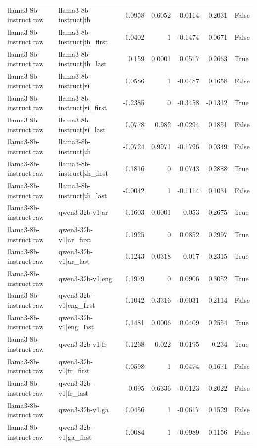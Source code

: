 \begin{table}
\begin{tabular}{l l r r r r l}
llama3-8b-instruct|raw & llama3-8b-instruct|th & 0.0958 & 0.6052 & -0.0114 & 0.2031 & False \\
llama3-8b-instruct|raw & llama3-8b-instruct|th_first & -0.0402 & 1 & -0.1474 & 0.0671 & False \\
llama3-8b-instruct|raw & llama3-8b-instruct|th_last & 0.159 & 0.0001 & 0.0517 & 0.2663 & True \\
llama3-8b-instruct|raw & llama3-8b-instruct|vi & 0.0586 & 1 & -0.0487 & 0.1658 & False \\
llama3-8b-instruct|raw & llama3-8b-instruct|vi_first & -0.2385 & 0 & -0.3458 & -0.1312 & True \\
llama3-8b-instruct|raw & llama3-8b-instruct|vi_last & 0.0778 & 0.982 & -0.0294 & 0.1851 & False \\
llama3-8b-instruct|raw & llama3-8b-instruct|zh & -0.0724 & 0.9971 & -0.1796 & 0.0349 & False \\
llama3-8b-instruct|raw & llama3-8b-instruct|zh_first & 0.1816 & 0 & 0.0743 & 0.2888 & True \\
llama3-8b-instruct|raw & llama3-8b-instruct|zh_last & -0.0042 & 1 & -0.1114 & 0.1031 & False \\
llama3-8b-instruct|raw & qwen3-32b-v1|ar & 0.1603 & 0.0001 & 0.053 & 0.2675 & True \\
llama3-8b-instruct|raw & qwen3-32b-v1|ar_first & 0.1925 & 0 & 0.0852 & 0.2997 & True \\
llama3-8b-instruct|raw & qwen3-32b-v1|ar_last & 0.1243 & 0.0318 & 0.017 & 0.2315 & True \\
llama3-8b-instruct|raw & qwen3-32b-v1|eng & 0.1979 & 0 & 0.0906 & 0.3052 & True \\
llama3-8b-instruct|raw & qwen3-32b-v1|eng_first & 0.1042 & 0.3316 & -0.0031 & 0.2114 & False \\
llama3-8b-instruct|raw & qwen3-32b-v1|eng_last & 0.1481 & 0.0006 & 0.0409 & 0.2554 & True \\
llama3-8b-instruct|raw & qwen3-32b-v1|fr & 0.1268 & 0.022 & 0.0195 & 0.234 & True \\
llama3-8b-instruct|raw & qwen3-32b-v1|fr_first & 0.0598 & 1 & -0.0474 & 0.1671 & False \\
llama3-8b-instruct|raw & qwen3-32b-v1|fr_last & 0.095 & 0.6336 & -0.0123 & 0.2022 & False \\
llama3-8b-instruct|raw & qwen3-32b-v1|ga & 0.0456 & 1 & -0.0617 & 0.1529 & False \\
llama3-8b-instruct|raw & qwen3-32b-v1|ga_first & 0.0084 & 1 & -0.0989 & 0.1156 & False \\

\end{tabular}
\end{table}
